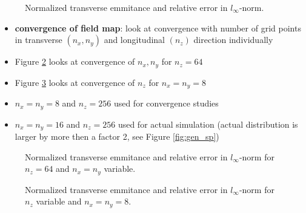 \begin{center}
\begin{figure}[H]
   \begin{subfigure}{0.4\textwidth}
      
   \end{subfigure}
   \qquad \qquad \qquad
   \begin{subfigure}{0.4\textwidth}
      
   \end{subfigure}
   \caption{Normalized transverse emmitance and relative error in $l_\infty$-norm.}
   \label{fig:int_cvg}
\end{figure}
\end{center}

\begin{itemize}
   \item \textbf{convergence of field map}: look at convergence with number of grid points in transverse $(n_x, n_y)$ and longitudinal $(n_z)$ direction individually
   \item Figure \ref{fig:map_cvg_xy} looks at convergence of $n_x, n_y$ for $n_z=64$
   \item Figure \ref{fig:map_cvg_z} looks at convergence of $n_z$ for $n_x=n_y=8$
   \item $n_x=n_y=8$ and $n_z=256$ used for convergence studies
   \item $n_x=n_y=16$ and $n_z=256$ used for actual simulation (actual distribution is larger by more then a factor 2, see Figure \ref{fig:gen_sp})
\end{itemize}

\begin{center}
\begin{figure}[H]
   \begin{subfigure}{0.4\textwidth}
      
   \end{subfigure}
   \qquad \qquad \qquad
   \begin{subfigure}{0.4\textwidth}
      
   \end{subfigure}
   \caption{Normalized transverse emmitance and relative error in $l_\infty$-norm for $n_z=64$ and $n_x=n_y$ variable.}
   \label{fig:map_cvg_xy}
\end{figure}
\end{center}

\begin{center}
\begin{figure}[H]
   \begin{subfigure}{0.4\textwidth}
      
   \end{subfigure}
   \qquad \qquad \qquad
   \begin{subfigure}{0.4\textwidth}
      
   \end{subfigure}
   \caption{Normalized transverse emmitance and relative error in $l_\infty$-norm for $n_z$ variable and $n_x=n_y=8$.}
   \label{fig:map_cvg_z}
\end{figure}
\end{center}

